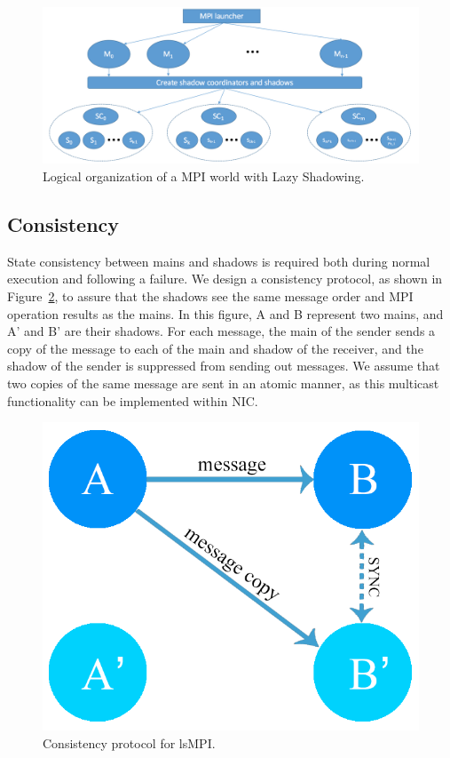 \begin{figure}[!t]
  \begin{center}
      \includegraphics[width=\columnwidth]{figures/logical_org}
  \end{center}
  \caption{Logical organization of a MPI world with Lazy Shadowing.}
  \label{fig:logical_org}
\end{figure}

\subsection{Consistency}

State consistency between mains and shadows is required both during normal execution and following a failure. %
We design a consistency protocol, as shown in Figure~\ref{fig:cons_protocol}, 
to assure 
that the shadows see the same message order and MPI operation results as the mains. In this figure, A and B represent two mains, and A' and B' are their shadows. 
For each message, the main of the sender sends a copy of the message to each of the main and shadow of the receiver, and the shadow of the sender is suppressed from sending out messages. We assume that two copies of the same message are sent in an atomic manner, as this multicast functionality can be implemented within NIC. 


\begin{figure}[!t]
  \begin{center}
      	\includegraphics[width=0.7\columnwidth]{figures/cons_protocol}
  \end{center}
  \caption{Consistency protocol for lsMPI.}
  \label{fig:cons_protocol}
\end{figure}

